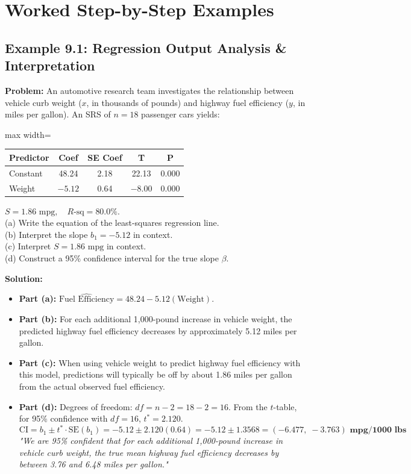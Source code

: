 \section{Worked Step-by-Step Examples}

\subsection*{Example 9.1: Regression Output Analysis \& Interpretation}
\textbf{Problem:} An automotive research team investigates the relationship between vehicle curb weight ($x$, in thousands of pounds) and highway fuel efficiency ($y$, in miles per gallon). An SRS of $n = 18$ passenger cars yields:
\begin{center}
\begin{adjustbox}{max width=\linewidth}
\begin{tabular}{lcccc}
\toprule
\textbf{Predictor} & \textbf{Coef} & \textbf{SE Coef} & \textbf{T} & \textbf{P} \\
\midrule
Constant & 48.24 & 2.18 & 22.13 & 0.000 \\
Weight & $-5.12$ & 0.64 & $-8.00$ & 0.000 \\
\bottomrule
\end{tabular}
\end{adjustbox}
\end{center}
$S = 1.86\text{ mpg}, \quad R\text{-sq} = 80.0\%$.\\
(a) Write the equation of the least-squares regression line.\\
(b) Interpret the slope $b_1 = -5.12$ in context.\\
(c) Interpret $S = 1.86\text{ mpg}$ in context.\\
(d) Construct a 95\% confidence interval for the true slope $\beta$.

\textbf{Solution:}
\begin{itemize}[leftmargin=1.2em]
  \item \textbf{Part (a):} $\widehat{\text{Fuel Efficiency}} = 48.24 - 5.12(\text{Weight})$.
  \item \textbf{Part (b):} For each additional 1,000-pound increase in vehicle weight, the predicted highway fuel efficiency decreases by approximately 5.12 miles per gallon.
  \item \textbf{Part (c):} When using vehicle weight to predict highway fuel efficiency with this model, predictions will typically be off by about 1.86 miles per gallon from the actual observed fuel efficiency.
  \item \textbf{Part (d):} Degrees of freedom: $df = n - 2 = 18 - 2 = 16$.
  From the $t$-table, for 95\% confidence with $df = 16$, $t^* = 2.120$.\\
  \[ \text{CI} = b_1 \pm t^* \cdot \text{SE}(b_1) = -5.12 \pm 2.120(0.64) = -5.12 \pm 1.3568 = \mathbf{(-6.477, \; -3.763)\text{ mpg/1000 lbs}} \]
  \textit{"We are 95\% confident that for each additional 1,000-pound increase in vehicle curb weight, the true mean highway fuel efficiency decreases by between 3.76 and 6.48 miles per gallon."}
\end{itemize}

